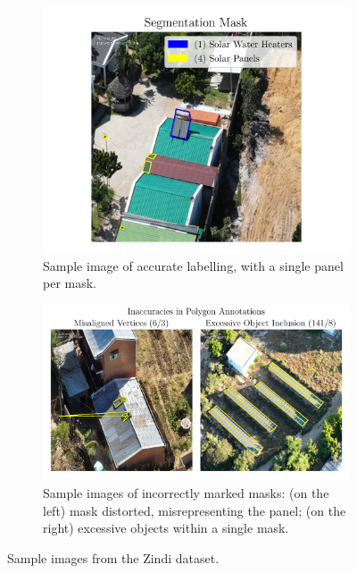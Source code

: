\documentclass[conference]{IEEEtran}
\begin{document}
\begin{figure}[H]
    \centering
    \begin{subfigure}[b]{\linewidth}
        \centering
        \includegraphics[width=\linewidth]{assets/data_segmentation_mask.png}
        \caption{Sample image of accurate labelling, with a single panel per mask.}
        \label{fig:data_segmentation_mask}
    \end{subfigure}

    \vspace{0.5em}

    \begin{subfigure}[b]{\linewidth}
        \centering
        \includegraphics[width=\linewidth]{assets/data_poly_problems.png}
        \caption{Sample images of incorrectly marked masks: (on the left) mask distorted, misrepresenting the panel; (on the right) excessive objects within a single mask.}
        \label{fig:data_poly_problems}
    \end{subfigure}
    \caption{Sample images from the Zindi dataset.}
    \label{fig:combined_segmentation_poly_issues}
\end{figure}
\end{document}
